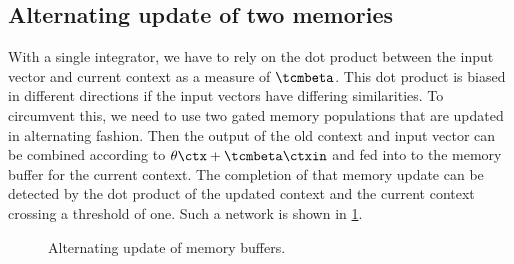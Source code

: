 \subsection{Alternating update of two memories}
With a single integrator, we have to rely on the dot product between the input vector and current context as a measure of $\tcmbeta$.
This dot product is biased in different directions if the input vectors have differing similarities.
To circumvent this, we need to use two gated memory populations that are updated in alternating fashion.
Then the output of the old context and input vector can be combined according to $\theta \ctx + \tcmbeta \ctxin$ and fed into to the memory buffer for the current context.
The completion of that memory update can be detected by the dot product of the updated context and the current context crossing a threshold of one.
Such a network is shown in \cref{fig:ctx-alt-update}.
\begin{figure}
    \centering
    \caption{Alternating update of memory buffers.}\label{fig:ctx-alt-update}
\end{figure}

